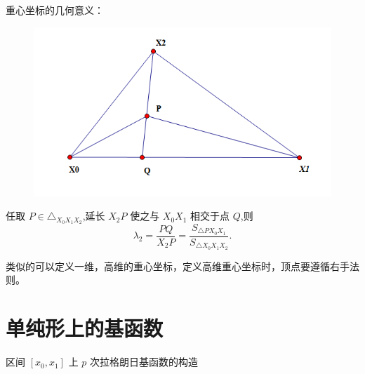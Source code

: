 \documentclass[12pt,a4paper]{article}
\begin{document}
重心坐标的几何意义：

\begin{figure}[H]
\centering
\includegraphics[scale=0.7]{./figures/2.png}
\caption{}
\end{figure}

任取 $P\in \triangle_{X_0 X_1 X_2}$,延长 $X_2 P$ 使之与 $X_0 X_1$ 相交于点 $Q$,则
$$
\lambda _2=\frac {PQ}{X_2 P}=\frac{S_{\triangle PX_0 X_1}}{S_{\triangle X_0 X_1 X_2}}.
$$

类似的可以定义一维，高维的重心坐标，定义高维重心坐标时，顶点要遵循右手法则。

\section{单纯形上的基函数}
区间 $[x_0,x_1]$ 上 $p$ 次拉格朗日基函数的构造
\end{document}
